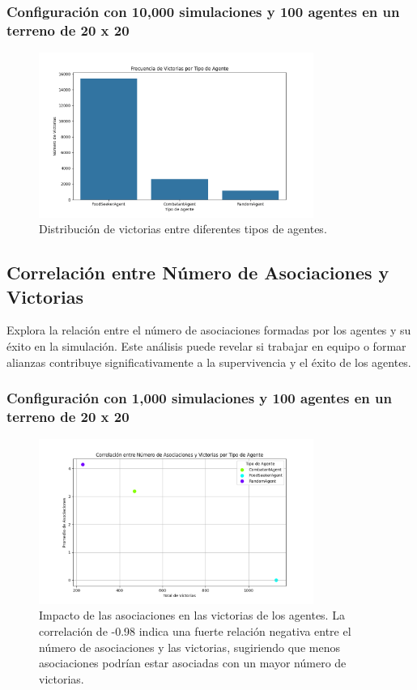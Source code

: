 \documentclass[11pt]{article}
\begin{document}
\subsubsection{Configuración con 10,000 simulaciones y 100 agentes en un terreno de 20 x 20}
\begin{figure}[H]
    \centering
    \includegraphics[width=0.8\textwidth]{images/agent_wins_num_simulations10000_size(20x20)_agents_count100.png}
    \caption{Distribución de victorias entre diferentes tipos de agentes.}
\end{figure}

\subsection{Correlación entre Número de Asociaciones y Victorias}
Explora la relación entre el número de asociaciones formadas por los agentes y su éxito en la simulación. Este análisis puede revelar si trabajar en equipo o formar alianzas contribuye significativamente a la supervivencia y el éxito de los agentes.

\subsubsection{Configuración con 1,000 simulaciones y 100 agentes en un terreno de 20 x 20}
\begin{figure}[H]
    \centering
    \includegraphics[width=0.8\textwidth]{images/Figure_2.png}
    \caption{Impacto de las asociaciones en las victorias de los agentes. La correlación de -0.98 indica una fuerte relación negativa entre el número de asociaciones y las victorias, sugiriendo que menos asociaciones podrían estar asociadas con un mayor número de victorias.}
\end{figure}
\end{document}
